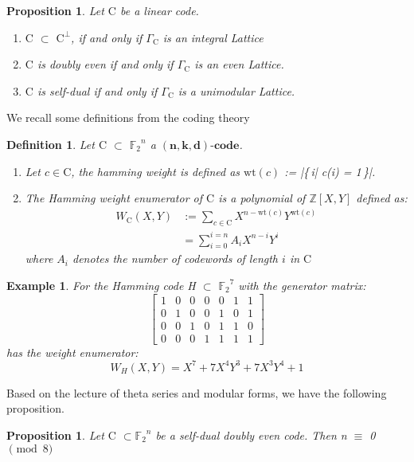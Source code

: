 \documentclass{article}
\newtheorem{definition}[theorem]{Definition}
\newtheorem{example}[theorem]{Example}
\newtheorem{prop}[theorem]{Proposition}
\numberwithin{equation}{theorem}
\numberwithin{figure}{theorem}
\newcommand{\Ftwo}{\ensuremath{\mathbb{F}_2}}
\newcommand{\simpleCodes}{\ensuremath{\mathrm{C}}}
\newcommand{\buildVertical}[1]{\ensuremath{#1^{\bot}}}
\newcommand{\buildLattice}[1]{\ensuremath{\Gamma_{#1}}}
\newcommand{\weightEnumerator}[3]{\ensuremath{W_{#1}(#2,#3)}}
\newcommand{\linearCode}[3]{\ensuremath{\bm{(#1,#2,#3)\mbox{-}code}}}
\newcommand{\wt}[1]{\ensuremath{\text{wt}(#1)}}
\newcommand{\Integer}{\ensuremath{\mathbb{Z}}}
\begin{document}
\begin{prop}\label{codeLatticeProp} Let {\simpleCodes} be a linear code.
	\begin{enumerate}
		\item {\simpleCodes} $\subset$ {\buildVertical{\simpleCodes}}, if and only if {\buildLattice{\simpleCodes}} is an integral Lattice
		\item {\simpleCodes} is doubly even if and only if {\buildLattice{\simpleCodes}} is an even Lattice.
		\item {\simpleCodes} is self-dual if and only if {\buildLattice{\simpleCodes}} is a unimodular Lattice.
	\end{enumerate}
\end{prop}
We recall some definitions from the coding theory
\begin{definition} Let {\simpleCodes} $\subset$ $\Ftwo^{n}$ a \linearCode{n}{k}{d}. 
	\begin{enumerate}
		\item Let $c \in \simpleCodes$, the hamming weight is defined as \wt{c} := |\{\,i| c(i) = 1\,\}|.
		\item The \emph{Hamming weight enumerator} of {\simpleCodes} is a polynomial of $\Integer[X,Y]$ defined as:
		\begin{align*}
			\weightEnumerator{\simpleCodes}{X}{Y} &:= \sum_{c \in \simpleCodes}X^{n - \wt{c}}Y^{\wt{c}}\\
			&= \sum_{i = 0}^{i = n}A_i X^{n - i}Y^i
		\end{align*}
		where $A_i$ denotes the number of codewords of length $i$ in {\simpleCodes}
	\end{enumerate}
\end{definition}
\begin{example}
	For the Hamming code H $\subset$ $\Ftwo^7$ with the generator matrix:
	\[
	\left[
		\begin{matrix}
			1 &0 &0 &0 &0 &1 &1 \\
			0 &1 &0 &0 &1 &0 &1 \\
			0 &0 &1 &0 &1 &1 &0 \\
			0 &0 &0 &1 &1 &1 &1
		\end{matrix}
	\right]
	\]
	has the weight enumerator:
	\[
		\weightEnumerator{H}{X}{Y} = X^7 + 7X^4Y^3 + 7X^3Y^4 + 1
	\]
\end{example}
Based on the lecture of theta series and modular forms, we have the following proposition.
\begin{prop}
Let {\simpleCodes} $\subset \Ftwo^n$ be a self-dual doubly even code. Then n $\equiv$ 0 $\pmod 8$ 
\end{prop}
\end{document}

